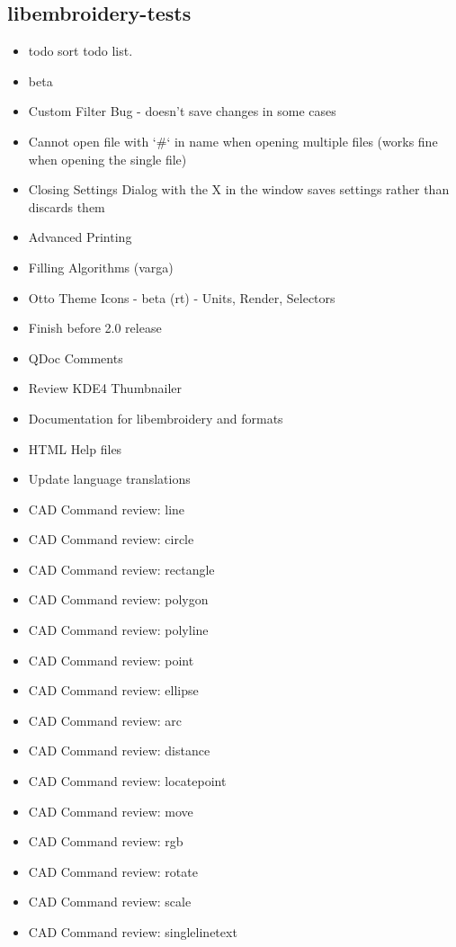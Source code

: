 \documentclass[10pt]{report}
\begin{document}
\subsection{libembroidery-tests}

\begin{itemize}
\item todo sort todo list.
\item beta
  \item Custom Filter Bug - doesn't save changes in some cases
  \item Cannot open file with `\#` in name when opening multiple files (works fine when opening the single file)
  \item Closing Settings Dialog with the X in the window saves settings rather than discards them
  \item Advanced Printing
  \item Filling Algorithms (varga)
  \item Otto Theme Icons - beta (rt) - Units, Render, Selectors
\item Finish before 2.0 release
  \item QDoc Comments
  \item Review KDE4 Thumbnailer
  \item Documentation for libembroidery and formats
  \item HTML Help files
  \item Update language translations
  \item CAD Command review: line
  \item CAD Command review: circle
  \item CAD Command review: rectangle
  \item CAD Command review: polygon
  \item CAD Command review: polyline
  \item CAD Command review: point
  \item CAD Command review: ellipse
  \item CAD Command review: arc
  \item CAD Command review: distance
  \item CAD Command review: locatepoint
  \item CAD Command review: move
  \item CAD Command review: rgb
  \item CAD Command review: rotate
  \item CAD Command review: scale
  \item CAD Command review: singlelinetext

\end{itemize}
\end{document}
